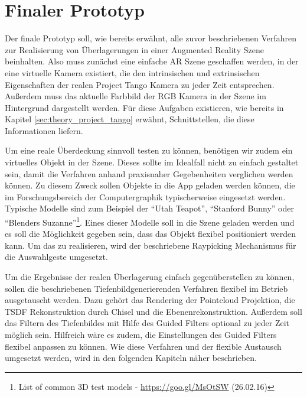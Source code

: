 \section{Finaler Prototyp} \label{sec:final_prototype}

Der finale Prototyp soll, wie bereits erwähnt, alle zuvor beschriebenen Verfahren zur Realisierung von Überlagerungen in einer Augmented Reality Szene beinhalten. Also muss zunächst eine einfache AR Szene geschaffen werden, in der eine virtuelle Kamera existiert, die den intrinsischen und extrinsischen Eigenschaften der realen Project Tango Kamera zu jeder Zeit entsprechen. Außerdem muss das aktuelle Farbbild der RGB Kamera in der Szene im Hintergrund dargestellt werden. Für diese Aufgaben existieren, wie bereits in Kapitel \ref{sec:theory_project_tango} erwähnt, Schnittstellen, die diese Informationen liefern. 

Um eine reale Überdeckung sinnvoll testen zu können, benötigen wir zudem ein virtuelles Objekt in der Szene. Dieses sollte im Idealfall nicht zu einfach gestaltet sein, damit die Verfahren anhand praxisnaher Gegebenheiten verglichen werden können. Zu diesem Zweck sollen Objekte in die App geladen werden können, die im Forschungsbereich der Computergraphik typischerweise eingesetzt werden. Typische Modelle sind zum Beispiel der \enquote{Utah Teapot}, \enquote{Stanford Bunny} oder \enquote{Blenders Suzanne}\footnote{List of common 3D test models - \url{https://goo.gl/MsOtSW} (26.02.16)}.  Eines dieser Modelle soll in die Szene geladen werden und es soll die Möglichkeit gegeben sein, dass das Objekt flexibel positioniert werden kann. Um das zu realisieren, wird der beschriebene Raypicking Mechanismus für die Auswahlgeste umgesetzt.

Um die Ergebnisse der realen Überlagerung einfach gegenüberstellen zu können, sollen die beschriebenen Tiefenbild\-generierenden Verfahren flexibel im Betrieb ausgetauscht werden. Dazu gehört das Rendering der Pointcloud Projektion, die TSDF Rekonstruktion durch Chisel und die Ebenenrekonstruktion. Außerdem soll das Filtern des Tiefenbildes mit Hilfe des Guided Filters optional zu jeder Zeit möglich sein. Hilfreich wäre es zudem, die Einstellungen des Guided Filters flexibel anpassen zu können. Wie diese Verfahren und der flexible Austausch umgesetzt werden, wird in den folgenden Kapiteln näher beschrieben.